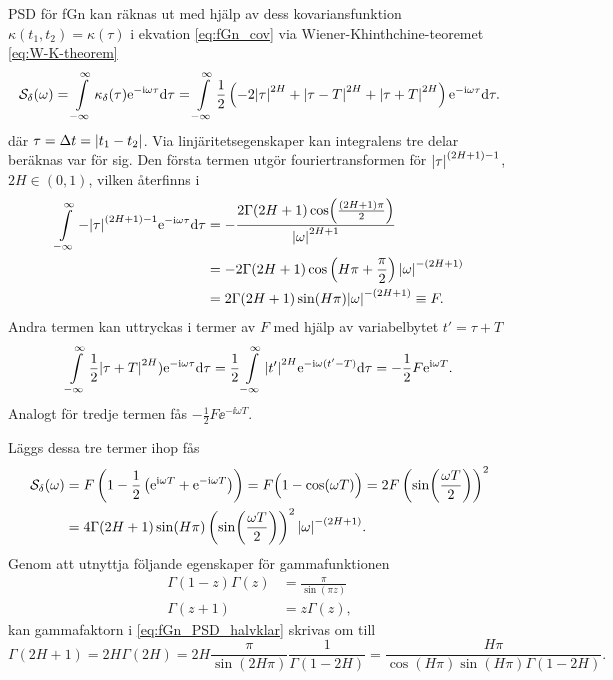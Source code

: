 PSD för fGn kan räknas ut med hjälp av dess kovariansfunktion $\kappa(t_1,t_2)=\kappa(\tau)$ i ekvation \eqref{eq:fGn_cov} via Wiener-Khinthchine-teoremet \eqref{eq:W-K-theorem}
\begin{equation} \label{eq:fGn_covterm}
    \mathcal{S}_{\delta}(\omega)
    =
    \int^{\infty}_{-\infty} 
    \kappa_{\delta}(\tau) \ee^{-\ii \omega\tau} \dd\tau 
    = 
    \int^{\infty}_{-\infty} \frac{1}{2} 
    \left(
    -2\abs{\tau}^{2H} + \abs{\tau-T}^{2H} + \abs{\tau+T}^{2H}
    \right) 
    \ee^{-\ii \omega\tau} \dd\tau.
\end{equation}
där $\tau=\Delta{t}=\abs{t_1-t_2}$.
Via linjäritetsegenskaper kan integralens tre delar beräknas var för sig. Den första termen utgör fouriertransformen för $\abs{\tau}^{(2H+1)-1}$, $2H\in (0,1)$, vilken återfinns i \cite{BETA}
\begin{equation}
\begin{aligned}
    \int^{\infty}_{-\infty} -\abs{\tau}^{(2H+1)-1}\ee^{-\ii \omega\tau} \dd\tau 
    &= -\frac{
    2\Gamma(2H+1)
    \cos(\frac{(2H+1)\pi}{2})}{
    \abs{\omega}^{2H+1}} 
    \\ 
    &= -2\Gamma{(2H+1)} \cos\left(H\pi+\frac{\pi}{2}\right) \abs{\omega}^{-(2H+1)} 
    \\
    &= 2\Gamma{(2H+1)}\sin(H\pi) \abs{\omega}^{-(2H+1)} \equiv F.
\end{aligned}
\end{equation}
Andra termen kan uttryckas i termer av $F$ med hjälp av variabelbytet $t'=\tau+T$
\begin{equation}
\int^{\infty}_{-\infty}\frac{1}{2} \abs{\tau+T}^{2H})\ee^{-\ii \omega\tau} \dd\tau 
= \frac{1}{2}\int^{\infty}_{-\infty} \abs{t'}^{2H} \ee^{-\ii \omega(t'-T)} \dd\tau 
= -\frac{1}{2} F \ee^{\ii \omega T}.
\end{equation}
Analogt för tredje termen fås $-\frac{1}{2}F\ee^{-\ii \omega T}$. 

Läggs dessa tre termer ihop fås
\begin{equation}
\begin{aligned}
    \mathcal{S}_{\delta}(\omega)
    &= F\left(1-\frac{1}{2}\left(\mathrm{e}^{\mathrm{i} \omega T}+\mathrm{e}^{-\mathrm{i} \omega T}\right)\right)
    = F\Big( 1-\cos(\omega T) \Big) 
    = 2F\left(\sin(\frac{\omega T}{2})\right)^2 \\
    &= 
    4\Gamma{(2H+1)}
    \sin(H\pi)\left(\sin(\frac{\omega T}{2})\right)^2 \abs{\omega}^{-(2H+1)}. \label{eq:fGn_PSD_halvklar}
\end{aligned}
\end{equation}
Genom att utnyttja följande egenskaper för gammafunktionen
\begin{align}
\Gamma(1-z)\Gamma(z)&=\frac{\pi}{\sin(\pi z)} \\
\Gamma(z+1)&=z\Gamma(z),
\end{align}
kan gammafaktorn i \eqref{eq:fGn_PSD_halvklar} skrivas om till
\begin{equation}
\Gamma(2H+1) 
= 2H \Gamma(2H) = 2H\frac{\pi}{\sin(2H\pi)}\frac{1}{\Gamma(1-2H)} 
= \frac{H\pi}{\cos(H\pi)\sin(H\pi)\Gamma(1-2H)}.
\end{equation}

